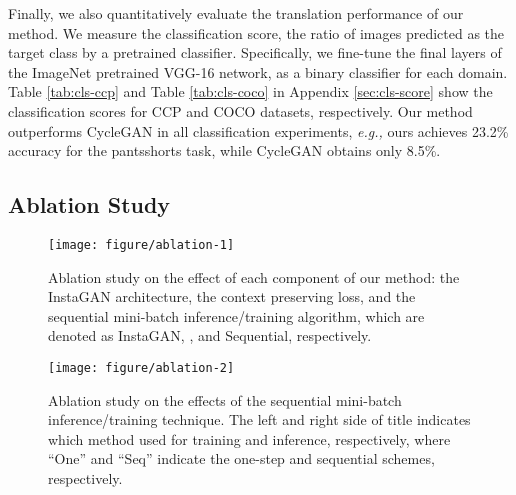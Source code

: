 \documentclass{article} \usepackage{iclr2019_conference,times}
\begin{document}
Finally, we also quantitatively evaluate the translation performance of our method.
We measure the classification score, the ratio of images predicted as the target class by a pretrained classifier.
Specifically, we fine-tune the final layers of the
ImageNet \citep{deng2009imagenet} pretrained VGG-16 \citep{simonyan2014very} network,
as a binary classifier for each domain.
Table \ref{tab:cls-ccp} and Table \ref{tab:cls-coco} in Appendix \ref{sec:cls-score} show the classification scores
for CCP and COCO datasets, respectively.
Our method outperforms CycleGAN in all classification experiments,
\textit{e.g.,} ours achieves 23.2\% accuracy for the pantsshorts task,
while CycleGAN obtains only 8.5\%.




\vspace{-0.025in}
\subsection{Ablation Study}
\label{sec:exp-ablation}
\vspace{-0.025in}

\begin{figure}[t]
\centering
	\texttt{[image: figure/ablation-1]}
	\caption{
	Ablation study on the effect of each component of our method: the InstaGAN architecture, the context preserving loss, and the sequential mini-batch inference/training algorithm,
	which are denoted as InstaGAN, , and Sequential, respectively.
} \label{fig:ablation-1}
\end{figure}	

\begin{figure}[t]
    \vspace{-0.2in}
	\texttt{[image: figure/ablation-2]}
	\caption{
	Ablation study on the effects of the sequential mini-batch inference/training technique.
	The left and right side of title indicates which method used for training and inference, respectively, where
	``One'' and ``Seq'' indicate the one-step and sequential schemes, respectively.
} \label{fig:ablation-2}
	\vspace{-0.1in}
\end{figure}
\end{document}
